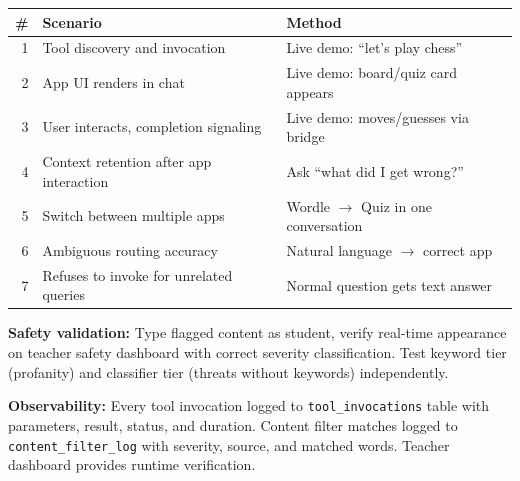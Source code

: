 \documentclass[11pt,letterpaper]{article}
\begin{document}
\begin{tabularx}{\textwidth}{r X l}
\toprule
\textbf{\#} & \textbf{Scenario} & \textbf{Method} \\
\midrule
1 & Tool discovery and invocation & Live demo: ``let's play chess'' \\
2 & App UI renders in chat & Live demo: board/quiz card appears \\
3 & User interacts, completion signaling & Live demo: moves/guesses via bridge \\
4 & Context retention after app interaction & Ask ``what did I get wrong?'' \\
5 & Switch between multiple apps & Wordle $\rightarrow$ Quiz in one conversation \\
6 & Ambiguous routing accuracy & Natural language $\rightarrow$ correct app \\
7 & Refuses to invoke for unrelated queries & Normal question gets text answer \\
\bottomrule
\end{tabularx}

\noindent\textbf{Safety validation:} Type flagged content as student, verify real-time appearance on teacher safety dashboard with correct severity classification. Test keyword tier (profanity) and classifier tier (threats without keywords) independently.

\noindent\textbf{Observability:} Every tool invocation logged to \texttt{tool\_invocations} table with parameters, result, status, and duration. Content filter matches logged to \texttt{content\_filter\_log} with severity, source, and matched words. Teacher dashboard provides runtime verification.
\end{document}
